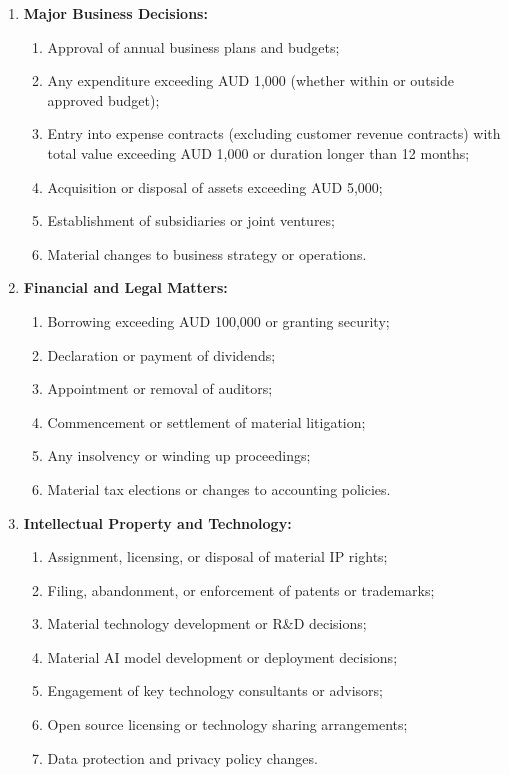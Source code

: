 \begin{enumerate}[label=\arabic*.]
    \item \textbf{Major Business Decisions:}
        \begin{enumerate}[label=(\alph*)]
            \item Approval of annual business plans and budgets;
            \item Any expenditure exceeding AUD 1,000 (whether within or outside approved budget);
            \item Entry into expense contracts (excluding customer revenue contracts) with total value exceeding AUD 1,000 or duration longer than 12 months;
            \item Acquisition or disposal of assets exceeding AUD 5,000;
            \item Establishment of subsidiaries or joint ventures;
            \item Material changes to business strategy or operations.
        \end{enumerate}

    \item \textbf{Financial and Legal Matters:}
        \begin{enumerate}[label=(\alph*)]
            \item Borrowing exceeding AUD 100,000 or granting security;
            \item Declaration or payment of dividends;
            \item Appointment or removal of auditors;
            \item Commencement or settlement of material litigation;
            \item Any insolvency or winding up proceedings;
            \item Material tax elections or changes to accounting policies.
        \end{enumerate}

    \item \textbf{Intellectual Property and Technology:}
        \begin{enumerate}[label=(\alph*)]
            \item Assignment, licensing, or disposal of material IP rights;
            \item Filing, abandonment, or enforcement of patents or trademarks;
            \item Material technology development or R\&D decisions;
            \item Material AI model development or deployment decisions;
            \item Engagement of key technology consultants or advisors;
            \item Open source licensing or technology sharing arrangements;
            \item Data protection and privacy policy changes.
        \end{enumerate}
\end{enumerate}

